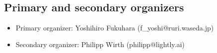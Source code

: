 \documentclass{article}
\begin{document}
\begin{enumerate}

\end{enumerate}

\subsection{Primary and secondary organizers}
\begin{itemize}
    \item Primary organizer: Yoshihiro Fukuhara (f\_yoshi@ruri.waseda.jp)
    \item Secondary organizer: Philipp Wirth (philipp@lightly.ai)
\end{itemize}
\end{document}
